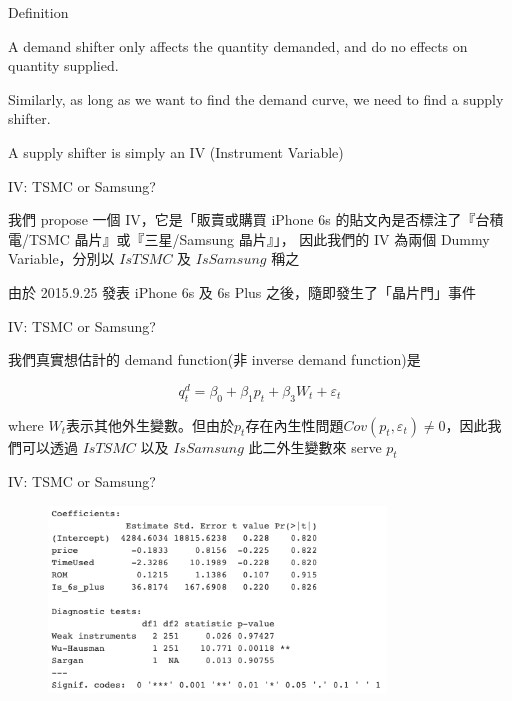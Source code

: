 \documentclass[11pt]{beamer}
\begin{document}
\begin{frame}[fragile]{Definition}

A demand shifter only affects the quantity demanded, and do no effects on quantity supplied.

Similarly, as long as we want to find the demand curve, we need to find a supply shifter.

A supply shifter is simply an IV (Instrument Variable)

\end{frame}

\begin{frame}[fragile]{IV: TSMC or Samsung?}

我們 propose 一個 IV，它是「販賣或購買 iPhone 6s 的貼文內是否標注了『台積電/TSMC 晶片』或『三星/Samsung 晶片』」， 因此我們的 IV 為兩個 Dummy Variable，分別以 $IsTSMC$ 及 $IsSamsung$ 稱之

由於 2015.9.25 發表 iPhone 6s 及 6s Plus 之後，隨即發生了「晶片門」事件

\end{frame}

\begin{frame}[fragile]{IV: TSMC or Samsung?}

我們真實想估計的 demand function(非 inverse demand function)是

$$q_t^d = \beta_0 + \beta_1 p_t + \beta_3 W_t + \varepsilon_t$$

where $W_t$表示其他外生變數。但由於$p_t$存在內生性問題$Cov(p_t, \varepsilon_t)\neq0$，因此我們可以透過 $IsTSMC$ 以及 $IsSamsung$ 此二外生變數來 serve $p_t$

\end{frame}


\begin{frame}[fragile]{IV: TSMC or Samsung?}

	\begin{figure}
		\begin{center}
			\includegraphics[width=0.8\textwidth]{figure/f07.png}
		\end{center}
	\end{figure}

\end{frame}
\end{document}
